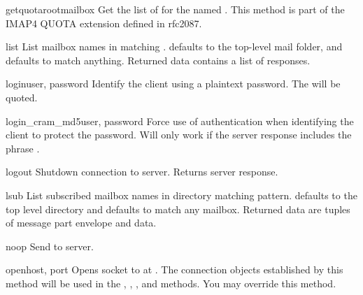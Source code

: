 \begin{methoddesc}{getquotaroot}{mailbox}
  Get the list of   for the named .
  This method is part of the IMAP4 QUOTA extension defined in rfc2087.
\end{methoddesc}

\begin{methoddesc}{list}{}
  List mailbox names in  matching
  .   defaults to the top-level mail
  folder, and  defaults to match anything.  Returned data
  contains a list of  responses.
\end{methoddesc}

\begin{methoddesc}{login}{user, password}
  Identify the client using a plaintext password.
  The  will be quoted.
\end{methoddesc}

\begin{methoddesc}{login_cram_md5}{user, password}
  Force use of  authentication when identifying the client to protect the password.
  Will only work if the server  response includes the phrase .
\end{methoddesc}

\begin{methoddesc}{logout}{}
  Shutdown connection to server. Returns server  response.
\end{methoddesc}

\begin{methoddesc}{lsub}{}
  List subscribed mailbox names in directory matching pattern.
   defaults to the top level directory and
   defaults to match any mailbox.
  Returned data are tuples of message part envelope and data.
\end{methoddesc}

\begin{methoddesc}{noop}{}
  Send  to server.
\end{methoddesc}

\begin{methoddesc}{open}{host, port}
  Opens socket to  at .
  The connection objects established by this method
  will be used in the , , , and  methods.
  You may override this method.
\end{methoddesc}

